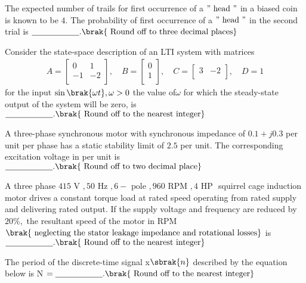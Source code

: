 \bigskip
\item The expected number of trails for first occurrence  of a $" \text{ head }"$ in a biased coin is known to be $4.$ The probability of first occurrence of a $" \text{ head }"$ in the second trial is $\underline{\hspace{2cm}}.\brak{\text{ Round off to three decimal places}}$
\bigskip
\item Consider the state-space description of an LTI system with matrices
\begin{align*}
    A = \begin{bmatrix}
0 & 1 \\
-1 & -2 \\
\end{bmatrix}, \quad
B = \begin{bmatrix}
0 \\
1 \\
\end{bmatrix}, \quad
C = \begin{bmatrix}
3 & -2 \\
\end{bmatrix}, \quad
D = 1
\end{align*}
for the input $\sin\brak{\omega t},\omega>0$ the value of$\omega$ for which the steady-state output of the system will be zero, is $\underline{\hspace{2cm}}.\brak{\text{ Round off to the nearest integer}}$
\bigskip
\item A three-phase synchronous motor with synchronous impedance of $0.1+j0.3$ per unit per phase has a static stability limit of $2.5$ per unit. The corresponding excitation voltage in per unit is $\underline{\hspace{2cm}}.\brak{\text{ Round off to two decimal place}}$
\bigskip
\item A three phase $415 \text{ V }, 50 \text{ Hz }, 6-\text{ pole }, 960 \text{ RPM }, 4 \text{ HP }$ squirrel cage induction motor drives a constant torque load at rated speed operating from rated supply and delivering rated output. If the supply voltage and frequency are reduced by $20\%,$ the resultant speed of the motor in RPM
$\brak{\text{ neglecting the stator leakage impedance and rotational losses}}$ is
$\underline{\hspace{2cm}}.\brak{\text{ Round off to the nearest integer}}$
\bigskip
\item The period of the discrete-time signal x$\sbrak{n}$ described by the equation below is N $=\underline{\hspace{2cm}}.\brak{\text{ Round off to the nearest integer}}$
